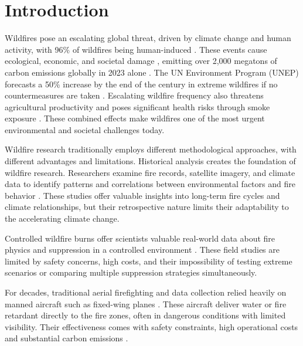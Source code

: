\documentclass[11pt, a4paper]{article}
\begin{document}
\section{Introduction}
\label{sec:Introduction}


Wildfires pose an escalating global threat, driven by climate change and human activity, with 96\% of wildfires being human-induced \citep{HybridAntColonyWildfire}. These events cause ecological, economic, and societal damage \citep{Saffre2022}, emitting over 2,000 megatons of carbon emissions globally in 2023 alone \citep{Lelis2024}. The UN Environment Program (UNEP) forecasts a 50\% increase by the end of the century in extreme wildfires if no countermeasures are taken \citep{Sullivan2022}. Escalating wildfire frequency also threatens agricultural productivity \citep{IPCC2023} and poses significant health risks through smoke exposure \citep{Finlay2012}. These combined effects make wildfires one of the most urgent environmental and societal challenges today.

Wildfire research traditionally employs different methodological approaches, with different advantages and limitations. Historical analysis creates the foundation of wildfire research. Researchers examine fire records, satellite imagery, and climate data to identify patterns and correlations between environmental factors and fire behavior \citep{copernicus-wildfires,IPCC2023}. These studies offer valuable insights into long-term fire cycles and climate relationships, but their retrospective nature limits their adaptability to the accelerating climate change. 

Controlled wildfire burns offer scientists valuable real-world data about fire physics and suppression in a controlled environment \citep{wildland}. These field studies are limited by safety concerns, high costs, and their impossibility of testing extreme scenarios or comparing multiple suppression strategies simultaneously.

For decades, traditional aerial firefighting and data collection relied heavily on manned aircraft such as fixed-wing planes \citep{janney2012airtankers}. These aircraft deliver water or fire retardant directly to the fire zones, often in dangerous conditions with limited visibility. Their effectiveness comes with safety constraints, high operational costs and substantial carbon emissions \citep{spicerRapidMeasurementEmissions2009}.
\end{document}
